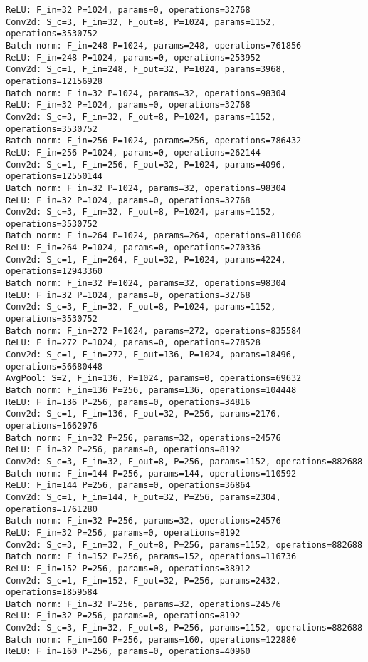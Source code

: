 \begin{Verbatim}[fontsize=\small]
ReLU: F_in=32 P=1024, params=0, operations=32768
Conv2d: S_c=3, F_in=32, F_out=8, P=1024, params=1152, operations=3530752
Batch norm: F_in=248 P=1024, params=248, operations=761856
ReLU: F_in=248 P=1024, params=0, operations=253952
Conv2d: S_c=1, F_in=248, F_out=32, P=1024, params=3968, operations=12156928
Batch norm: F_in=32 P=1024, params=32, operations=98304
ReLU: F_in=32 P=1024, params=0, operations=32768
Conv2d: S_c=3, F_in=32, F_out=8, P=1024, params=1152, operations=3530752
Batch norm: F_in=256 P=1024, params=256, operations=786432
ReLU: F_in=256 P=1024, params=0, operations=262144
Conv2d: S_c=1, F_in=256, F_out=32, P=1024, params=4096, operations=12550144
Batch norm: F_in=32 P=1024, params=32, operations=98304
ReLU: F_in=32 P=1024, params=0, operations=32768
Conv2d: S_c=3, F_in=32, F_out=8, P=1024, params=1152, operations=3530752
Batch norm: F_in=264 P=1024, params=264, operations=811008
ReLU: F_in=264 P=1024, params=0, operations=270336
Conv2d: S_c=1, F_in=264, F_out=32, P=1024, params=4224, operations=12943360
Batch norm: F_in=32 P=1024, params=32, operations=98304
ReLU: F_in=32 P=1024, params=0, operations=32768
Conv2d: S_c=3, F_in=32, F_out=8, P=1024, params=1152, operations=3530752
Batch norm: F_in=272 P=1024, params=272, operations=835584
ReLU: F_in=272 P=1024, params=0, operations=278528
Conv2d: S_c=1, F_in=272, F_out=136, P=1024, params=18496, operations=56680448
AvgPool: S=2, F_in=136, P=1024, params=0, operations=69632
Batch norm: F_in=136 P=256, params=136, operations=104448
ReLU: F_in=136 P=256, params=0, operations=34816
Conv2d: S_c=1, F_in=136, F_out=32, P=256, params=2176, operations=1662976
Batch norm: F_in=32 P=256, params=32, operations=24576
ReLU: F_in=32 P=256, params=0, operations=8192
Conv2d: S_c=3, F_in=32, F_out=8, P=256, params=1152, operations=882688
Batch norm: F_in=144 P=256, params=144, operations=110592
ReLU: F_in=144 P=256, params=0, operations=36864
Conv2d: S_c=1, F_in=144, F_out=32, P=256, params=2304, operations=1761280
Batch norm: F_in=32 P=256, params=32, operations=24576
ReLU: F_in=32 P=256, params=0, operations=8192
Conv2d: S_c=3, F_in=32, F_out=8, P=256, params=1152, operations=882688
Batch norm: F_in=152 P=256, params=152, operations=116736
ReLU: F_in=152 P=256, params=0, operations=38912
Conv2d: S_c=1, F_in=152, F_out=32, P=256, params=2432, operations=1859584
Batch norm: F_in=32 P=256, params=32, operations=24576
ReLU: F_in=32 P=256, params=0, operations=8192
Conv2d: S_c=3, F_in=32, F_out=8, P=256, params=1152, operations=882688
Batch norm: F_in=160 P=256, params=160, operations=122880
ReLU: F_in=160 P=256, params=0, operations=40960

\end{Verbatim}
